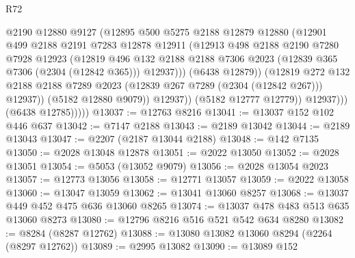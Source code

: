 \begin{lexlean}{R72}
\begin{coremodule}
                            @2190
                            @12880
                            @9127
                            (@12895
                              @500
                              @5275
                              @2188
                              @12879
                              @12880
                              (@12901
                                @499
                                @2188
                                @2191
                                @7283
                                @12878
                                @12911
                                (@12913
                                  @498
                                  @2188
                                  @2190
                                  @7280
                                  @7928
                                  @12923
                                  (@12819
                                    @496
                                    @132
                                    @2188
                                    @2188
                                    @7306
                                    @2023
                                    (@12839 @365 @7306 (@2304 (@12842 @365)))
                                    @12937)))
                              (@6438 @12879))
                            (@12819
                              @272
                              @132
                              @2188
                              @2188
                              @7289
                              @2023
                              (@12839 @267 @7289 (@2304 (@12842 @267)))
                              @12937))
                          (@5182 @12880 @9079))
                        @12937))
                    (@5182 @12777 @12779))
                  @12937)))
            (@6438 @12785)))))
@13037 := @12763 @8216
@13041 := @13037 @152 @102 @446 @637
@13042 := @7147 @2188
@13043 := @2189 @13042
@13044 := @2189 @13043
@13047 := @2207 (@2187 @13044 @2188)
@13048 := @142 @7135
@13050 := @2028 @13048 @12878
@13051 := @2022 @13050
@13052 := @2028 @13051
@13054 := @5053 (@13052 @9079)
@13056 := @2028 @13054 @2023
@13057 := @12773 @13056
@13058 := @12771 @13057
@13059 := @2022 @13058
@13060 := @13047 @13059
@13062 := @13041 @13060 @8257
@13068 := @13037 @449 @452 @475 @636 @13060 @8265
@13074 := @13037 @478 @483 @513 @635 @13060 @8273
@13080 := @12796 @8216 @516 @521 @542 @634 @8280
@13082 := @8284 (@8287 @12762)
@13088 := @13080 @13082 @13060 @8294 (@2264 (@8297 @12762))
@13089 := @2995 @13082
@13090 := @13089 @152

\end{coremodule}
\end{lexlean}
